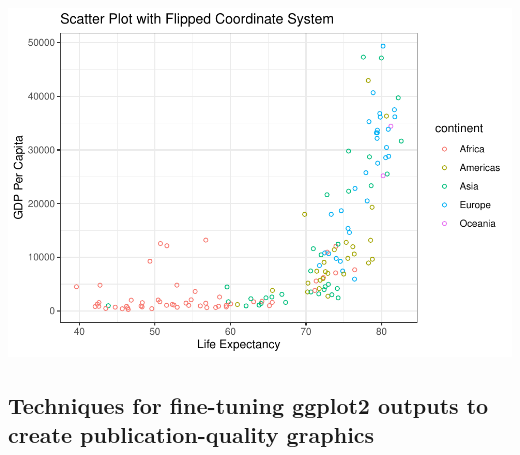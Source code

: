 \documentclass[
]{book}
\begin{document}
\includegraphics{_main_files/figure-latex/unnamed-chunk-86-1.pdf}

\subsection{Techniques for fine-tuning ggplot2 outputs to create publication-quality graphics}\label{techniques-for-fine-tuning-ggplot2-outputs-to-create-publication-quality-graphics}
\end{document}
